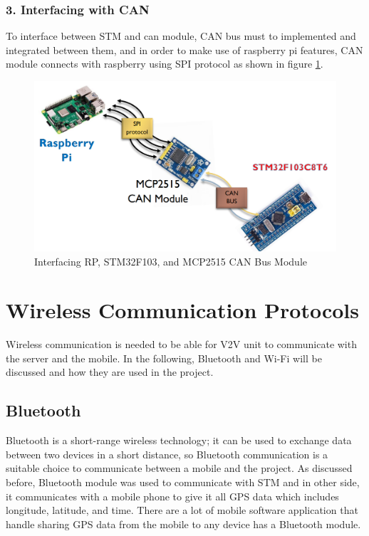 \subsubsection{3. Interfacing with CAN}
To interface between STM and can module, CAN bus must to implemented and integrated between them, and in order to make use of raspberry pi features, CAN module connects with raspberry using SPI protocol as shown in figure \ref{fig:interface-can}.
\begin{figure}[h]
   \centering
    \includegraphics[width=\textwidth]{figure/3_11.png}
    \caption{Interfacing RP, STM32F103, and MCP2515 CAN Bus Module}
    \label{fig:interface-can}
\end{figure}

\section{Wireless Communication Protocols}
Wireless communication is needed to be able for V2V unit to communicate with the server and the mobile. In the following, Bluetooth and Wi-Fi will be discussed and how they are used in the project.

\subsection{Bluetooth}
Bluetooth is a short-range wireless technology; it can be used to exchange data between two devices in a short distance, so Bluetooth communication is a suitable choice to communicate between a mobile and the project. \newline
As discussed before, Bluetooth module was used to communicate with STM and in other side, it communicates with a mobile phone to give it all GPS data which includes longitude, latitude, and time. There are a lot of mobile software application that handle sharing GPS data from the mobile to any device has a Bluetooth module. \newline

